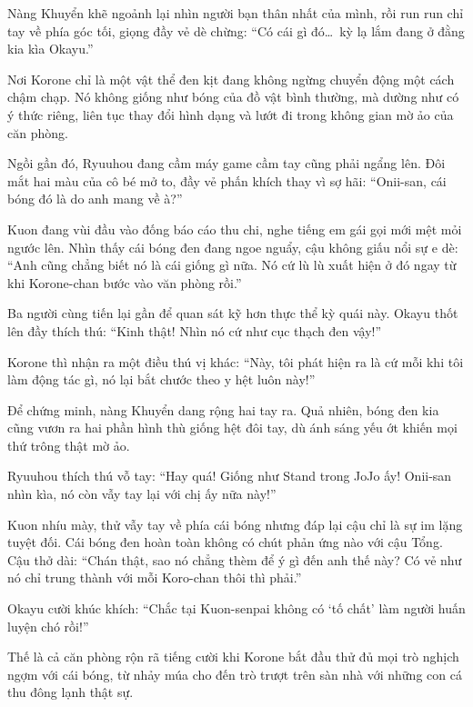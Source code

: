 \documentclass[../main.tex]{subfiles}
\begin{document}
Nàng Khuyển khẽ ngoảnh lại nhìn người bạn thân nhất của mình, rồi run run chỉ tay về phía góc tối, giọng đầy vẻ dè chừng: ``Có cái gì đó\dots\ kỳ lạ lắm đang ở đằng kia kìa Okayu.''


Nơi Korone chỉ là một vật thể đen kịt đang không ngừng chuyển động một cách chậm chạp. Nó không giống như bóng của đồ vật bình thường, mà dường như có ý thức riêng, liên tục thay đổi hình dạng và lướt đi trong không gian mờ ảo của căn phòng.

Ngồi gần đó, Ryuuhou đang cầm máy game cầm tay cũng phải ngẩng lên. Đôi mắt hai màu của cô bé mở to, đầy vẻ phấn khích thay vì sợ hãi: ``Onii-san, cái bóng đó là do anh mang về à?''

Kuon đang vùi đầu vào đống báo cáo thu chi, nghe tiếng em gái gọi mới mệt mỏi ngước lên. Nhìn thấy cái bóng đen đang ngoe nguẩy, cậu không giấu nổi sự e dè: ``Anh cũng chẳng biết nó là cái giống gì nữa. Nó cứ lù lù xuất hiện ở đó ngay từ khi Korone-chan bước vào văn phòng rồi.''

Ba người cùng tiến lại gần để quan sát kỹ hơn thực thể kỳ quái này. Okayu thốt lên đầy thích thú: ``Kinh thật! Nhìn nó cứ như cục thạch đen vậy!''

Korone thì nhận ra một điều thú vị khác: ``Này, tôi phát hiện ra là cứ mỗi khi tôi làm động tác gì, nó lại bắt chước theo y hệt luôn này!''


Để chứng minh, nàng Khuyển dang rộng hai tay ra. Quả nhiên, bóng đen kia cũng vươn ra hai phần hình thù giống hệt đôi tay, dù ánh sáng yếu ớt khiến mọi thứ trông thật mờ ảo.

Ryuuhou thích thú vỗ tay: ``Hay quá! Giống như Stand trong JoJo ấy! Onii-san nhìn kìa, nó còn vẫy tay lại với chị ấy nữa này!''

Kuon nhíu mày, thử vẫy tay về phía cái bóng nhưng đáp lại cậu chỉ là sự im lặng tuyệt đối. Cái bóng đen hoàn toàn không có chút phản ứng nào với cậu Tổng. Cậu thở dài: ``Chán thật, sao nó chẳng thèm để ý gì đến anh thế này? Có vẻ như nó chỉ trung thành với mỗi Koro-chan thôi thì phải.''

Okayu cười khúc khích: ``Chắc tại Kuon-senpai không có `tố chất' làm người huấn luyện chó rồi!''

Thế là cả căn phòng rộn rã tiếng cười khi Korone bắt đầu thử đủ mọi trò nghịch ngợm với cái bóng, từ nhảy múa cho đến trò trượt trên sàn nhà với những con cá thu đông lạnh thật sự.

\end{document}

